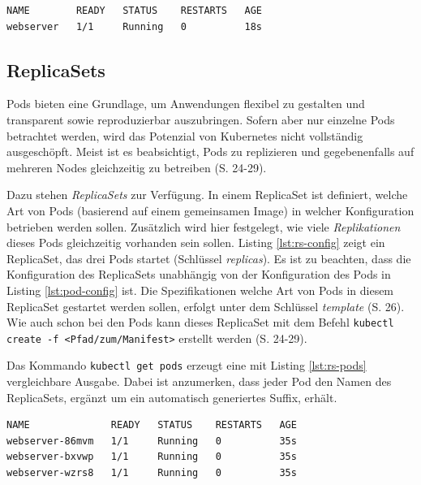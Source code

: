 \documentclass[11pt,a4paper]{article}
\begin{document}
\begin{lstlisting}[caption={Der Pod wurde erfolgreich gestartet \cite{Schmeling_Dargatz_2022} (S. 21).}, label={lst:pod-state}]
NAME        READY   STATUS    RESTARTS   AGE
webserver   1/1     Running   0          18s
\end{lstlisting}

\subsection{ReplicaSets}
Pods bieten eine Grundlage, um Anwendungen flexibel zu gestalten und
transparent sowie reproduzierbar auszubringen.
Sofern aber nur einzelne Pods betrachtet werden, wird das Potenzial von Kubernetes
nicht vollständig ausgeschöpft.
Meist ist es beabsichtigt, Pods zu replizieren und gegebenenfalls
auf mehreren Nodes gleichzeitig zu betreiben \cite{Schmeling_Dargatz_2022} (S. 24-29).

Dazu stehen \emph{ReplicaSets} zur Verfügung.
In einem ReplicaSet ist definiert, welche Art von Pods (basierend auf einem gemeinsamen Image)
in welcher Konfiguration betrieben werden sollen. Zusätzlich wird hier festgelegt, wie viele \emph{Replikationen}
dieses Pods gleichzeitig vorhanden sein sollen.
Listing \ref{lst:rs-config} zeigt ein ReplicaSet, das drei Pods startet (Schlüssel \emph{replicas}).
Es ist zu beachten, dass die Konfiguration des ReplicaSets unabhängig von der Konfiguration
des Pods in Listing \ref{lst:pod-config} ist.
Die Spezifikationen welche Art von Pods in diesem ReplicaSet gestartet werden sollen,
erfolgt unter dem Schlüssel \emph{template} \cite{Schmeling_Dargatz_2022} (S. 26).
Wie auch schon bei den Pods kann dieses ReplicaSet mit dem Befehl
\lstinline|kubectl create -f <Pfad/zum/Manifest>| erstellt werden \cite{Schmeling_Dargatz_2022} (S. 24-29).



Das Kommando \lstinline|kubectl get pods| erzeugt eine mit Listing \ref{lst:rs-pods}
vergleichbare Ausgabe. Dabei ist anzumerken, dass jeder Pod den Namen des ReplicaSets,
ergänzt um ein automatisch generiertes Suffix, erhält.

\begin{lstlisting}[caption={Drei Pods wurden erfolgreich gestartet \cite{Schmeling_Dargatz_2022} (S. 27).}, label={lst:rs-pods}]
NAME              READY   STATUS    RESTARTS   AGE
webserver-86mvm   1/1     Running   0          35s
webserver-bxvwp   1/1     Running   0          35s
webserver-wzrs8   1/1     Running   0          35s
\end{lstlisting}
\end{document}

